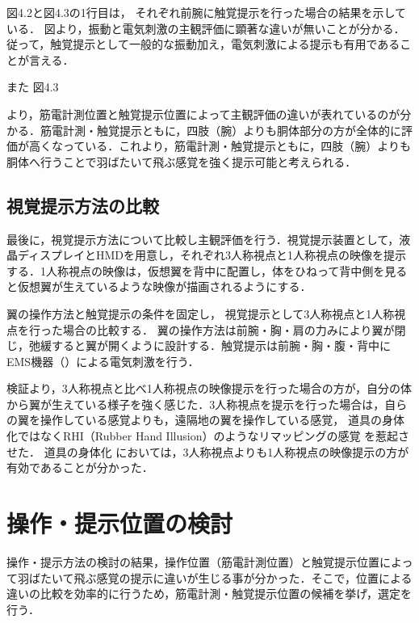         図4.2と図4.3の1行目は，
        それぞれ前腕に触覚提示を行った場合の結果を示している．
        図より，振動と電気刺激の主観評価に顕著な違いが無いことが分かる．従って，触覚提示として一般的な振動加え，電気刺激による提示も有用であることが言える．

        また
        図4.3
        
        より，筋電計測位置と触覚提示位置によって主観評価の違いが表れているのが分かる．筋電計測・触覚提示ともに，四肢（腕）よりも胴体部分の方が全体的に評価が高くなっている．これより，筋電計測・触覚提示ともに，四肢（腕）よりも胴体へ行うことで羽ばたいて飛ぶ感覚を強く提示可能と考えられる．
        

    \subsection{視覚提示方法の比較}
        最後に，視覚提示方法について比較し主観評価を行う．視覚提示装置として，液晶ディスプレイとHMDを用意し，それぞれ3人称視点と1人称視点の映像を提示する．1人称視点の映像は，仮想翼を背中に配置し，体をひねって背中側を見ると仮想翼が生えているような映像が描画されるようにする．

        翼の操作方法と触覚提示の条件を固定し，
        視覚提示として3人称視点と1人称視点を行った場合の比較する．
        翼の操作方法は前腕・胸・肩の力みにより翼が閉じ，弛緩すると翼が開くように設計する．触覚提示は前腕・胸・腹・背中にEMS機器（）による電気刺激を行う．

        検証より，3人称視点と比べ1人称視点の映像提示を行った場合の方が，自分の体から翼が生えている様子を強く感じた．3人称視点を提示を行った場合は，自らの翼を操作している感覚よりも，遠隔地の翼を操作している感覚，
        道具の身体化ではなくRHI（Rubber Hand Illusion）のようなリマッピングの感覚
        を惹起させた．
        道具の身体化
        においては，3人称視点よりも1人称視点の映像提示の方が有効であることが分かった．
    
\section{操作・提示位置の検討}
    操作・提示方法の検討の結果，操作位置（筋電計測位置）と触覚提示位置によって羽ばたいて飛ぶ感覚の提示に違いが生じる事が分かった．そこで，位置による違いの比較を効率的に行うため，筋電計測・触覚提示位置の候補を挙げ，選定を行う．
    

